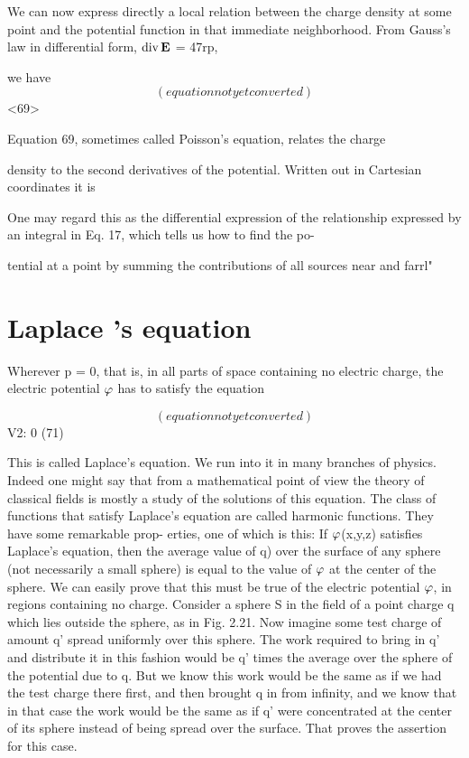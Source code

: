 We can now express directly a local relation between the charge
density at some point and the potential function in that immediate
neighborhood. From Gauss's law in differential form, $\operatorname{div}\mathbf{E}$ = 47rp,

we have
\begin{equation}
(equation not yet converted)
\end{equation}
<69>

Equation 69, sometimes called Poisson's equation, relates the charge

density to the second derivatives of the potential. Written out in
Cartesian coordinates it is

One may regard this as the differential expression of the relationship
expressed by an integral in Eq. 17, which tells us how to find the po-

tential at a point by summing the contributions of all sources near
and farrl"

\section{Laplace 's equation}

Wherever p = 0, that is, in all parts of space containing no electric
charge, the electric potential $\varphi$ has to satisfy the equation

\begin{equation}
(equation not yet converted)
\end{equation}
V2\pot: 0 (71)

This is called Laplace's equation. We run into it in many branches
of physics. Indeed one might say that from a mathematical point of
view the theory of classical fields is mostly a study of the solutions of
this equation. The class of functions that satisfy Laplace's equation
are called harmonic functions. They have some remarkable prop-
erties, one of which is this: If $\varphi$(x,y,z) satisfies Laplace's equation,
then the average value of q) over the surface of any sphere (not necessarily
a small sphere) is equal to the value of $\varphi$ at the center of the
sphere. We can easily prove that this must be true of the electric
potential $\varphi$, in regions containing no charge. Consider a sphere S
in the field of a point charge q which lies outside the sphere, as in
Fig. 2.21. Now imagine some test charge of amount q' spread uniformly
over this sphere. The work required to bring in q' and distribute
it in this fashion would be q' times the average over the sphere
of the potential due to q. But we know this work would be the same
as if we had the test charge there first, and then brought q in from
infinity, and we know that in that case the work would be the same as
if q' were concentrated at the center of its sphere instead of being
spread over the surface. That proves the assertion for this case.

